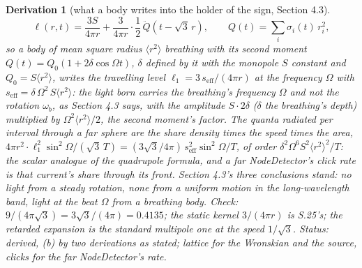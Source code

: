 \documentclass[pdflatex,sn-mathphys-num]{sn-jnl}
\theoremstyle{thmstyleone}
\newtheorem{derivation}{Derivation}
\begin{document}
\begin{derivation}[what a body writes into the holder of the sign, Section 4.3]
\[
\ell(r, t) = \frac{3S}{4\pi r} + \frac{3}{4\pi r}\cdot\frac{1}{2}\,\ddot Q(t - \sqrt 3\,r), \qquad Q(t) = \sum_i \sigma_i(t)\,r_i^2 ,
\]
so a body of mean square radius $\langle r^2\rangle$ breathing with its second moment $Q(t) = Q_0(1 + 2\delta\cos\Omega t)$, $\delta$ defined by it with the monopole $S$ constant and $Q_0 = S\langle r^2\rangle$, writes the travelling level $\ell_1 = 3\,s_{\mathrm{eff}} / (4\pi r)$ at the frequency $\Omega$ with $s_{\mathrm{eff}} = \delta\,\Omega^2\,S\langle r^2\rangle$: the light born carries the breathing's frequency $\Omega$ and not the rotation $\omega_b$, as Section 4.3 says, with the amplitude $S\cdot 2\delta$ ($\delta$ the breathing's depth) multiplied by $\Omega^2\langle r^2\rangle / 2$, the second moment's factor. The quanta radiated per interval through a far sphere are the share density times the speed times the area, $4\pi r^2\cdot\ell_1^2\sin^2\Omega / (\sqrt 3\,T) = (3\sqrt 3 / 4\pi)\,s_{\mathrm{eff}}^2\sin^2\Omega / T$, of order $\delta^2\Omega^6 S^2\langle r^2\rangle^2 / T$: the scalar analogue of the quadrupole formula, and a far NodeDetector's click rate is that current's share through its front. Section 4.3's three conclusions stand: no light from a steady rotation, none from a uniform motion in the long-wavelength band, light at the beat $\Omega$ from a breathing body. \emph{Check:} $9 / (4\pi\sqrt 3) = 3\sqrt 3 / (4\pi) = 0.4135$; the static kernel $3 / (4\pi r)$ is S.25's; the retarded expansion is the standard multipole one at the speed $1 / \sqrt 3$. \emph{Status:} derived, (b) by two derivations as stated; lattice for the Wronskian and the source, clicks for the far NodeDetector's rate.
\end{derivation}
\end{document}

